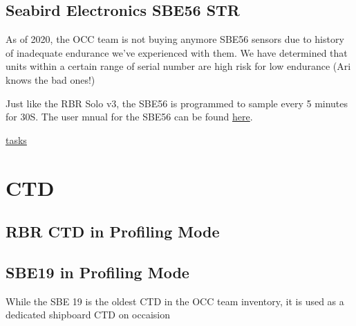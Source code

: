 \documentclass[]{book}
\begin{document}
\hypertarget{sbe56}{%
\section{Seabird Electronics SBE56 STR}\label{sbe56}}

As of 2020, the OCC team is not buying anymore SBE56 sensors due to history of inadequate endurance we've experienced with them. We have determined that units within a certain range of serial number are high risk for low endurance (Ari knows the bad ones!)

Just like the RBR Solo v3, the SBE56 is programmed to sample every 5 minutes for 30S. The user mnual for the SBE56 can be found \href{https://drive.google.com/drive/folders/1ujFmH1pJ704ikrsc11Ji2eNeuIBQ5JMa}{here}.

\protect\hyperlink{tasks}{tasks}

\hypertarget{ctd}{%
\chapter{CTD}\label{ctd}}

\hypertarget{rbr-ctd-in-profiling-mode}{%
\section{RBR CTD in Profiling Mode}\label{rbr-ctd-in-profiling-mode}}

\hypertarget{sbe19-in-profiling-mode}{%
\section{SBE19 in Profiling Mode}\label{sbe19-in-profiling-mode}}

While the SBE 19 is the oldest CTD in the OCC team inventory, it is used as a dedicated shipboard CTD on occaision
\end{document}
